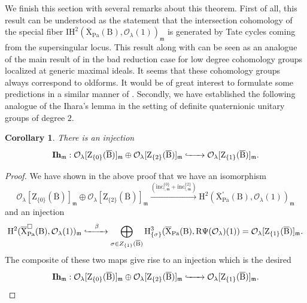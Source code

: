 \documentclass[10pt]{amsart}
\numberwithin{equation}{section}
\newtheorem{corollary}[equation]{Corollary}
\theoremstyle{definition}
\def\Pa{\mathrm{Pa}}
\def\calO{\mathcal{O}}
\def\fracm{\mathfrak{m}}
\def\rmB{\mathrm{B}}
\def\rmH{\mathrm{H}}
\def\rmR{\mathrm{R}}
\def\rmX{\mathrm{X}}
\def\rmZ{\mathrm{Z}}
\begin{document}
We finish this section with several remarks about this theorem. First of all, this result can be understood as the statement that the intersection cohomology of the special fiber $\mathrm{IH}^{2}(\overline{\rmX}_{\Pa}(\rmB), \calO_{\lambda}(1))_{\fracm}$ is generated by Tate cycles coming from the supersingular locus. This result along with \cite[Proposition 6.3.1]{LTXZZ} can be seen as an analogue of the main result of \cite{XZ} in the bad reduction case for low degree cohomology groups localized at generic maximal ideals. It seems that these cohomology groups always correspond to oldforms. It would be of great interest to formulate some predictions in a similar manner of \cite{XZ}. Secondly, we have established the following analogue of the Ihara's lemma in the setting of definite quaternionic unitary groups of degree $2$. 
\begin{corollary}
There is an injection 
\begin{equation*}
\mathbf{Ih}_{\fracm}: \calO_{\lambda}[\rmZ_{\{0\}}(\overline{\rmB})]_{\fracm}\oplus\calO_{\lambda}[\rmZ_{\{2\}}(\overline{\rmB})]_{\fracm}\xhookrightarrow{\phantom{aaaa}} \calO_{\lambda}[\rmZ_{\{1\}}(\overline{\rmB})]_{\fracm}.
\end{equation*}
\end{corollary}
\begin{proof}
We have shown in the above proof that we have an isomorphism
\begin{equation*}
\calO_{\lambda}[\rmZ_{\{0\}}(\overline{\rmB})]_{\fracm}\oplus\calO_{\lambda}[\rmZ_{\{2\}}(\overline{\rmB})]_{\fracm}\xrightarrow{(\mathrm{inc}^{\{0\}}_{!, \fracm}+\mathrm{inc}^{\{2\}}_{!, \fracm})} \rmH^{2}(\overline{\rmX}^{\square}_{\Pa}(\rmB), \calO_{\lambda}(1))_{\fracm}
\end{equation*}
and an injection
\begin{equation*}
\rmH^{2}(\overline{\rmX}^{\square}_{\Pa}(\rmB), \calO_{\lambda}(1))_{\fracm} \xhookrightarrow{\phantom{aa}\beta\phantom{aa}}  \bigoplus_{\sigma\in Z_{\{1\}}(\overline{\rmB})}\rmH^{3}_{\{\sigma\}}(\overline{\rmX}_{\Pa}(\rmB), \rmR\Psi(\calO_{\lambda})(1))
=\calO_{\lambda}[\rmZ_{\{1\}}(\overline{\rmB})]_{\fracm}.
\end{equation*}
The composite of these two maps give rise to an injection which is the desired
\begin{equation*}
\mathbf{Ih}_{\fracm}: \calO_{\lambda}[\rmZ_{\{0\}}(\overline{\rmB})]_{\fracm}\oplus\calO_{\lambda}[\rmZ_{\{2\}}(\overline{\rmB})]_{\fracm}\xhookrightarrow{\phantom{aaaa}} \calO_{\lambda}[\rmZ_{\{1\}}(\overline{\rmB})]_{\fracm}.
\end{equation*}
\end{proof}
\end{document}
